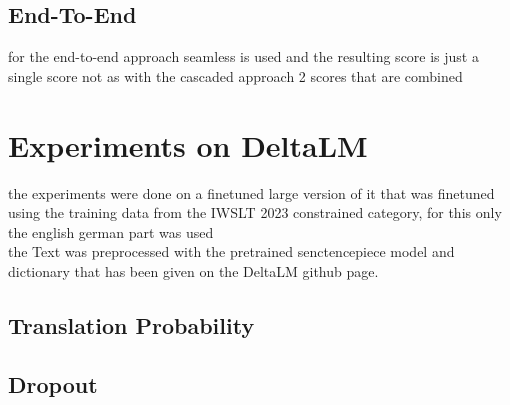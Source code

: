 \section{End-To-End}
for the end-to-end approach seamless is used and the resulting score is just a single score not as with the cascaded approach 2 scores that are combined 

\chapter{Experiments on DeltaLM}
the experiments \cite{ma2021deltalm} were done on a finetuned large version of it that was finetuned using the training data from the IWSLT 2023 constrained category, for this only the english german part was used
\\
the Text was preprocessed with the pretrained senctencepiece model and dictionary that has been given on the DeltaLM github page. 




\section{Translation Probability}

\section{Dropout}
